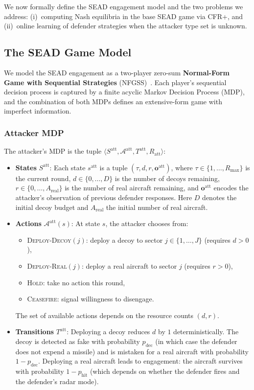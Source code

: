 \documentclass[sigconf]{aamas}
\newcommand{\Satt}{S^{\mathrm{att}}}
\newcommand{\Aatt}{\mathcal{A}^{\mathrm{att}}}
\newcommand{\pdeceive}{p_{\mathrm{dec}}}
\newcommand{\phit}{p_{\mathrm{hit}}}
\begin{document}
We now formally define the SEAD engagement model and the two problems we address: (i)~computing Nash equilibria in the base SEAD game via CFR+, and (ii)~online learning of defender strategies when the attacker type set is unknown.

\subsection{The SEAD Game Model}
\label{sec:sead_model}

We model the SEAD engagement as a two-player zero-sum \textbf{Normal-Form Game with Sequential Strategies} (NFGSS)~\cite{Lisy2016}. Each player's sequential decision process is captured by a finite acyclic Markov Decision Process (MDP), and the combination of both MDPs defines an extensive-form game with imperfect information.

\subsubsection{Attacker MDP}
The attacker's MDP is the tuple $\langle \Satt, \Aatt, T^{\mathrm{att}}, R_{\mathrm{att}} \rangle$:
\begin{itemize}
    \item \textbf{States} $\Satt$: Each state $s^{\mathrm{att}}$ is a tuple $(\tau, d, r, \mathbf{o}^{\mathrm{att}})$, where $\tau \in \{1, \ldots, R_{\max}\}$ is the current round, $d \in \{0, \ldots, D\}$ is the number of decoys remaining, $r \in \{0, \ldots, A_{\mathrm{real}}\}$ is the number of real aircraft remaining, and $\mathbf{o}^{\mathrm{att}}$ encodes the attacker's observation of previous defender responses. Here $D$ denotes the initial decoy budget and $A_{\mathrm{real}}$ the initial number of real aircraft.
    \item \textbf{Actions} $\Aatt(s)$: At state $s$, the attacker chooses from:
    \begin{itemize}
        \item \textsc{Deploy-Decoy}$(j)$: deploy a decoy to sector $j \in \{1, \ldots, J\}$ (requires $d > 0$),
        \item \textsc{Deploy-Real}$(j)$: deploy a real aircraft to sector $j$ (requires $r > 0$),
        \item \textsc{Hold}: take no action this round,
        \item \textsc{Ceasefire}: signal willingness to disengage.
    \end{itemize}
    The set of available actions depends on the resource counts $(d, r)$.
    \item \textbf{Transitions} $T^{\mathrm{att}}$: Deploying a decoy reduces $d$ by $1$ deterministically. The decoy is detected as fake with probability $\pdeceive$ (in which case the defender does not expend a missile) and is mistaken for a real aircraft with probability $1 - \pdeceive$. Deploying a real aircraft leads to engagement: the aircraft survives with probability $1 - \phit$ (which depends on whether the defender fires and the defender's radar mode).
\end{itemize}
\end{document}

